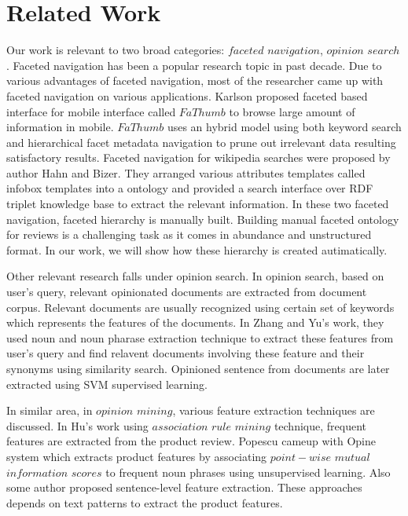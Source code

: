 \section{Related Work}\label{sec:related-work}

Our work is relevant to two broad categories: $faceted$ $navigation$, $opinion$ $search$. Faceted navigation has been a popular research topic in past decade. Due to various advantages of faceted navigation, most of the researcher came up with faceted navigation on various applications. Karlson\cite{Karlson:2006:FFI:1124772.1124878} proposed faceted based interface for mobile interface called $FaThumb$ to browse large amount of information in mobile. $FaThumb$ uses an hybrid model using both keyword search and hierarchical facet metadata navigation to prune out irrelevant data resulting satisfactory results. Faceted navigation for wikipedia searches were proposed by author Hahn and Bizer\cite{hahn2010faceted}. They arranged various attributes templates called infobox templates into a ontology and provided a search interface over RDF triplet knowledge base to extract the relevant information. In these two faceted navigation, faceted hierarchy is manually built. Building manual faceted ontology for reviews is a challenging task as it comes in abundance and unstructured format. In our work, we will show how these hierarchy is created autimatically.

Other relevant research falls under opinion search\cite{liu2012sentiment}. In opinion search, based on user's query, relevant opinionated documents are extracted from document corpus. Relevant documents are usually recognized using certain set of keywords which represents the features of the documents. In Zhang and Yu's work\cite{Zhang:2008:GMU:1390334.1390405}, they used noun and noun pharase extraction technique\cite{Zhang:2007:RCN:1321440.1321540} to extract these features from user's query and find relavent documents involving these feature and their synonyms using similarity search. Opinioned sentence from documents are later extracted using SVM supervised learning. 

In similar area, in $opinion$ $mining$, various feature extraction techniques are discussed. In Hu's work\cite{hu2004mining} using $association$ $rule$ $mining$ technique, frequent features are extracted from the product review. Popescu\cite{popescu2005opine} cameup with Opine system which extracts product features by associating $point-wise$ $mutual$ $information$ $scores$ to frequent noun phrases using unsupervised learning. Also some author proposed sentence-level feature extraction\cite{baccianella2009multi,ding2008holistic}. These approaches depends on text patterns to extract the product features.


